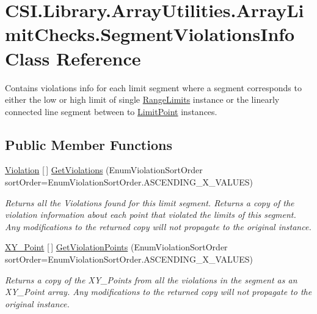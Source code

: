 \hypertarget{class_c_s_i_1_1_library_1_1_array_utilities_1_1_array_limit_checks_1_1_segment_violations_info}{}\section{C\+S\+I.\+Library.\+Array\+Utilities.\+Array\+Limit\+Checks.\+Segment\+Violations\+Info Class Reference}
\label{class_c_s_i_1_1_library_1_1_array_utilities_1_1_array_limit_checks_1_1_segment_violations_info}


Contains violations info for each limit segment where a segment corresponds to either the low or high limit of single \mbox{\hyperlink{class_c_s_i_1_1_library_1_1_array_utilities_1_1_array_limit_checks_1_1_range_limits}{Range\+Limits}} instance or the linearly connected line segment between to \mbox{\hyperlink{class_c_s_i_1_1_library_1_1_array_utilities_1_1_array_limit_checks_1_1_limit_point}{Limit\+Point}} instances.  


\subsection*{Public Member Functions}
\begin{DoxyCompactItemize}
\item 
\mbox{\hyperlink{class_c_s_i_1_1_library_1_1_array_utilities_1_1_array_limit_checks_1_1_violation}{Violation}} \mbox{[}$\,$\mbox{]} \mbox{\hyperlink{class_c_s_i_1_1_library_1_1_array_utilities_1_1_array_limit_checks_1_1_segment_violations_info_ad4de19b57d46097c741c418872278596}{Get\+Violations}} (Enum\+Violation\+Sort\+Order sort\+Order=Enum\+Violation\+Sort\+Order.\+A\+S\+C\+E\+N\+D\+I\+N\+G\+\_\+\+X\+\_\+\+V\+A\+L\+U\+ES)
\begin{DoxyCompactList}\small\item\em Returns all the Violations found for this limit segment. Returns a copy of the violation information about each point that violated the limits of this segment. Any modifications to the returned copy will not propagate to the original instance. \end{DoxyCompactList}\item 
\mbox{\hyperlink{struct_c_s_i_1_1_library_1_1_data_types_1_1_x_y___point}{X\+Y\+\_\+\+Point}} \mbox{[}$\,$\mbox{]} \mbox{\hyperlink{class_c_s_i_1_1_library_1_1_array_utilities_1_1_array_limit_checks_1_1_segment_violations_info_a68b0f5cb191ec4d9b4c70c0a120b9cfa}{Get\+Violation\+Points}} (Enum\+Violation\+Sort\+Order sort\+Order=Enum\+Violation\+Sort\+Order.\+A\+S\+C\+E\+N\+D\+I\+N\+G\+\_\+\+X\+\_\+\+V\+A\+L\+U\+ES)
\begin{DoxyCompactList}\small\item\em Returns a copy of the X\+Y\+\_\+\+Points from all the violations in the segment as an X\+Y\+\_\+\+Point array. Any modifications to the returned copy will not propagate to the original instance. \end{DoxyCompactList}\end{DoxyCompactItemize}
